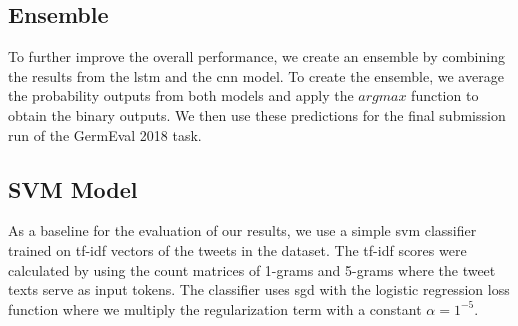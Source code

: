 \documentclass[11pt]{article}
\begin{document}
\subsection{Ensemble}
To further improve the overall performance, we create an ensemble by combining the results from the \ac{lstm} and the \ac{cnn} model. To create the ensemble, we average the probability outputs from both models and apply the $argmax$ function to obtain the binary outputs. We then use these predictions for the final submission run of the GermEval 2018 task.
\subsection{SVM Model}
As a baseline for the evaluation of our results, we use a simple \ac{svm} classifier trained on \ac{tf-idf} vectors \cite{RN75} of the tweets in the dataset. The \ac{tf-idf} scores were calculated by using the count matrices of 1-grams and 5-grams where the tweet texts serve as input tokens. The classifier uses \ac{sgd} with the logistic regression loss function where we multiply the regularization term with a constant $\alpha=1^{-5}$.
\end{document}
